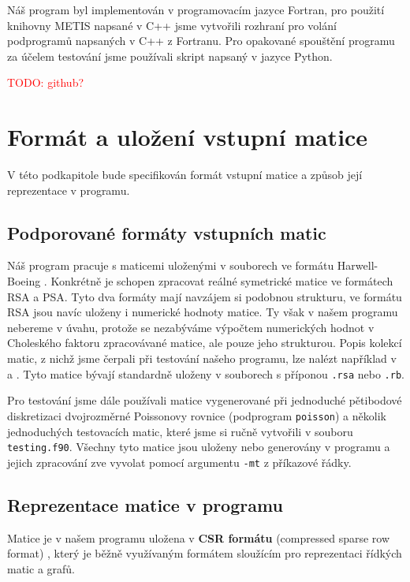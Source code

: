 \documentclass{ctuthesis}
\theoremstyle{plain}
\theoremstyle{definition}
\newcommand{\TODO}[1]{\textcolor{red}{TODO: #1}\PackageWarning{TODO:}{TODO: #1!}}
\begin{document}
Náš program byl implementován v programovacím jazyce Fortran, pro použití knihovny METIS napsané v C++ jsme vytvořili rozhraní pro volání podprogramů napsaných v C++ z Fortranu. Pro opakované spouštění programu za účelem testování jsme používali skript napsaný v jazyce Python.

\TODO{github?}

\section{Formát a uložení vstupní matice}
V této podkapitole bude specifikován formát vstupní matice a způsob její reprezentace v programu.

\subsection{Podporované formáty vstupních matic}

Náš program pracuje s maticemi uloženými v souborech ve formátu Harwell-Boeing \cite{bopo:97}. Konkrétně je schopen zpracovat reálné symetrické matice ve formátech RSA a PSA. Tyto dva formáty mají navzájem si podobnou strukturu, ve formátu RSA jsou navíc uloženy i numerické hodnoty matice. Ty však v našem programu nebereme v úvahu, protože se nezabýváme výpočtem numerických hodnot v Choleského faktoru zpracovávané matice, ale pouze jeho strukturou. Popis kolekcí matic, z nichž jsme čerpali při testování našeho programu, lze nalézt například v \cite{ssmcol} a \cite{hbcol}. Tyto matice bývají standardně uloženy v souborech s příponou \texttt{.rsa} nebo \texttt{.rb}.

Pro testování jsme dále používali matice vygenerované při jednoduché pětibodové diskretizaci dvojrozměrné Poissonovy rovnice (podprogram \texttt{poisson}) a několik jednoduchých testovacích matic, které jsme si ručně vytvořili v souboru \texttt{testing.f90}. Všechny tyto matice jsou uloženy nebo generovány v programu a jejich zpracování zve vyvolat pomocí argumentu \texttt{-mt} z příkazové řádky.

\subsection{Reprezentace matice v programu}
\label{matrixProgReprez}

Matice je v našem programu uložena v \textbf{CSR formátu} (compressed sparse row format) \cite{pis:84,saad:94}, který je běžně využívaným formátem sloužícím pro reprezentaci řídkých matic a grafů.
\end{document}
